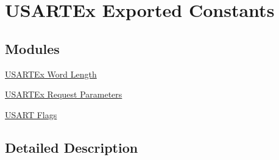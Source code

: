 \hypertarget{group___u_s_a_r_t_ex___exported___constants}{}\section{U\+S\+A\+R\+T\+Ex Exported Constants}
\label{group___u_s_a_r_t_ex___exported___constants}
\subsection*{Modules}
\begin{DoxyCompactItemize}
\item 
\hyperlink{group___u_s_a_r_t_ex___word___length}{U\+S\+A\+R\+T\+Ex Word Length}
\item 
\hyperlink{group___u_s_a_r_t___request___parameters}{U\+S\+A\+R\+T\+Ex Request Parameters}
\item 
\hyperlink{group___u_s_a_r_t___flags}{U\+S\+A\+R\+T Flags}
\end{DoxyCompactItemize}


\subsection{Detailed Description}
